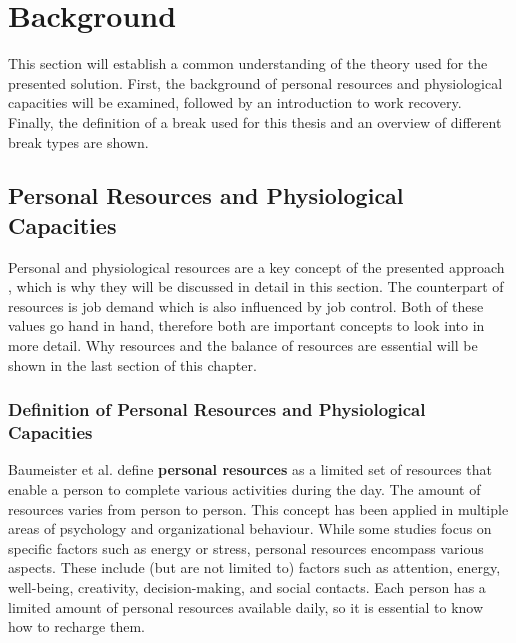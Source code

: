 \documentclass{hasel_thesis}
\begin{document}
 \chapter{Background} \label{background}

This section will establish a common understanding of the theory used for the presented solution. First, the background of personal resources and physiological capacities will be examined, followed by an introduction to work recovery. Finally, the definition of a break used for this thesis and an overview of different break types are shown.

\section{Personal Resources and Physiological Capacities}

Personal and physiological resources are a key concept of the presented approach , which is why they will be discussed in detail in this section. The counterpart of resources is job demand which is also influenced by job control. Both of these values go hand in hand, therefore both are important concepts to look into in more detail. Why resources and the balance of resources are essential will be shown in the last section of this chapter.

\subsection{Definition of Personal Resources and Physiological Capacities}
Baumeister et al. \cite{BaumeisterR.F.BratslavskyE.MuravenM.&TiceD.M..1998} define \textbf{personal resources} as a limited set of resources that enable a person to complete various activities during the day. The amount of resources varies from person to person. This concept has been applied in multiple areas of psychology and organizational behaviour. While some studies focus on specific factors such as energy or stress, personal resources encompass various aspects. These include (but are not limited to) factors such as attention, energy, well-being, creativity, decision-making, and social contacts. Each person has a limited amount of personal resources available daily, so it is essential to know how to recharge them. 
\end{document}

